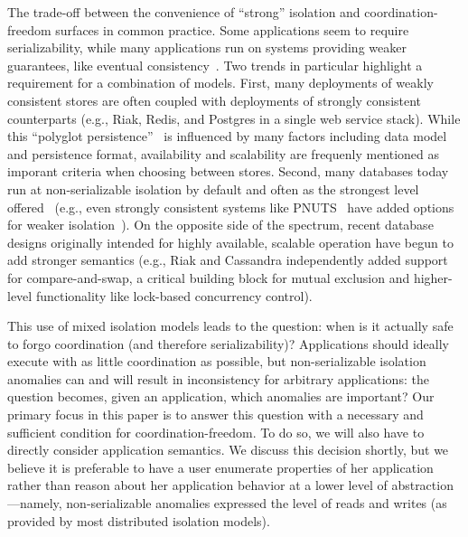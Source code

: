 
 The trade-off between
the convenience of ``strong'' isolation and coordination-freedom
surfaces in common practice. Some applications seem to require
serializability, while many applications run on systems providing
weaker guarantees, like eventual consistency~\cite{vogels-defs}. Two
trends in particular highlight a requirement for a combination of
models. First, many deployments of weakly consistent stores are often
coupled with deployments of strongly consistent counterparts (e.g.,
Riak, Redis, and Postgres in a single web service stack). While this
``polyglot persistence''~\cite{polyglot} is influenced by many factors
including data model and persistence format, availability and
scalability are frequenly mentioned as imporant criteria when choosing
between stores. Second, many databases today run at non-serializable
isolation by default and often as the strongest level
offered~\cite{hat-vldb} (e.g., even strongly consistent systems like
PNUTS~\cite{pnuts} have added options for weaker
isolation~\cite{pnuts-update}). On the opposite side of the spectrum,
recent database designs originally intended for highly available,
scalable operation have begun to add stronger semantics (e.g., Riak
and Cassandra independently added support for compare-and-swap, a
critical building block for mutual exclusion and higher-level
functionality like lock-based concurrency control).

This use of mixed isolation models leads to the question: when is it
actually safe to forgo coordination (and therefore serializability)?
Applications should ideally execute with as little coordination as
possible, but non-serializable isolation anomalies can and will result
in inconsistency for arbitrary applications: the question becomes,
given an application, which anomalies are important? Our primary focus
in this paper is to answer this question with a necessary and
sufficient condition for coordination-freedom. To do so, we will also
have to directly consider application semantics. We discuss this
decision shortly, but we believe it is preferable to have a user
enumerate properties of her application rather than reason about her
application behavior at a lower level of abstraction---namely,
non-serializable anomalies expressed the level of reads and writes (as
provided by most distributed isolation models).




